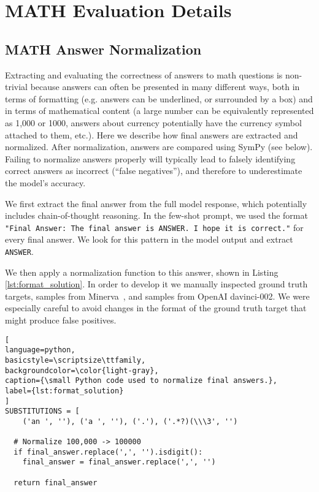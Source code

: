 \documentclass{article}
\newcommand{\ourmodel}[0]{{Minerva~}}
\begin{document}
\section{MATH Evaluation Details}

\subsection{MATH Answer Normalization}
\label{appendix:evaluation_formatting}

Extracting and evaluating the correctness of answers to math questions is non-trivial because answers can often be presented in many different ways, both in terms of formatting (e.g. answers can be underlined, or surrounded by a box) and in terms of mathematical content (a large number can be equivalently represented as 1,000 or 1000, answers about currency potentially have the currency symbol attached to them, etc.). Here we describe how final answers are extracted and normalized. After normalization, answers are compared using SymPy (see below). Failing to normalize answers properly will typically lead to falsely identifying correct answers as incorrect (``false negatives''), and therefore to underestimate the model's accuracy.

We first extract the final answer from the full model response, which potentially includes chain-of-thought reasoning. In the few-shot prompt, we used the format \texttt{"Final Answer: The final answer is ANSWER. I hope it is correct."} for every final answer. We look for this pattern in the model output and extract \texttt{ANSWER}.

We then apply a normalization function to this answer, shown in Listing \ref{lst:format_solution}.
In order to develop it we manually inspected ground truth targets, samples from \ourmodel\!, and samples from OpenAI davinci-002. We were especially careful to avoid changes in the format of the ground truth target that might produce false positives.

\clearpage
\begin{lstlisting}[
language=python,
basicstyle=\scriptsize\ttfamily,
backgroundcolor=\color{light-gray},
caption={\small Python code used to normalize final answers.},
label={lst:format_solution}
]
SUBSTITUTIONS = [
    ('an ', ''), ('a ', ''), ('.'), ('.*?)(\\\3', '')
  
  # Normalize 100,000 -> 100000
  if final_answer.replace(',', '').isdigit():
    final_answer = final_answer.replace(',', '')
    
  return final_answer
\end{lstlisting}
\end{document}

